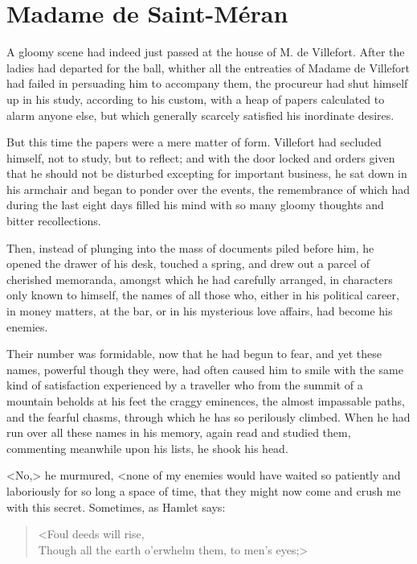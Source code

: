 \chapter{Madame de Saint-Méran} 
	
\lettrine{A}{} gloomy scene had indeed just passed at the house of M. de Villefort. After the ladies had departed for the ball, whither all the entreaties of Madame de Villefort had failed in persuading him to accompany them, the procureur had shut himself up in his study, according to his custom, with a heap of papers calculated to alarm anyone else, but which generally scarcely satisfied his inordinate desires. 

 But this time the papers were a mere matter of form. Villefort had secluded himself, not to study, but to reflect; and with the door locked and orders given that he should not be disturbed excepting for important business, he sat down in his armchair and began to ponder over the events, the remembrance of which had during the last eight days filled his mind with so many gloomy thoughts and bitter recollections. 

 Then, instead of plunging into the mass of documents piled before him, he opened the drawer of his desk, touched a spring, and drew out a parcel of cherished memoranda, amongst which he had carefully arranged, in characters only known to himself, the names of all those who, either in his political career, in money matters, at the bar, or in his mysterious love affairs, had become his enemies. 

 Their number was formidable, now that he had begun to fear, and yet these names, powerful though they were, had often caused him to smile with the same kind of satisfaction experienced by a traveller who from the summit of a mountain beholds at his feet the craggy eminences, the almost impassable paths, and the fearful chasms, through which he has so perilously climbed. When he had run over all these names in his memory, again read and studied them, commenting meanwhile upon his lists, he shook his head. 

 <No,> he murmured, <none of my enemies would have waited so patiently and laboriously for so long a space of time, that they might now come and crush me with this secret. Sometimes, as Hamlet says:  
 
 \begin{verse}
<Foul deeds will rise,\\ 
Though all the earth o'erwhelm them, to men's eyes;> 
\end{verse}

